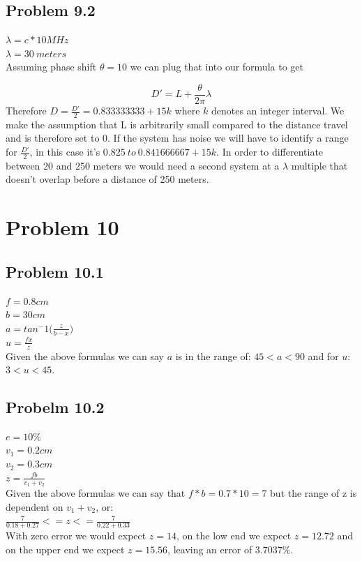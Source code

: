\documentclass{article}
\begin{document}
\newpage
\subsection{Problem 9.2}
\noindent $\lambda = c * 10 MHz$\\
$\lambda = 30\ meters$\\


Assuming phase shift $\theta = 10$ we can plug that into our formula to get

$$D' = L + \frac{\theta}{2\pi}\lambda$$
Therefore $D = \frac{D'}{2} = 0.833333333 + 15k$ where $k$ denotes an integer 
interval. We make the assumption that L is arbitrarily small compared to the 
distance travel and is therefore set to $0$. If the system has noise we will 
have to identify a range for $\frac{D'}{2}$, in this case it's $0.825\ to\ 
0.841666667 + 15k$. In order to differentiate between 20 and 250 meters we would 
need a second system at a $\lambda$ multiple that doesn't overlap before a 
distance of 250 meters.

\section{\textbf{Problem 10}}
\subsection{Problem 10.1}
\noindent$f = 0.8cm$\\
$b = 30cm$\\
$a = tan^-1 \big(\frac{z}{b-x}\big)$\\
$u = \frac{fx}{z}$\\

\noindent Given the above formulas we can say $a$ is in the range of: 
$45 < a < 90$ and for $u$: $3 < u < 45$.

\subsection{Probelm 10.2}
\noindent$e = 10\%$\\
$v_1 = 0.2cm$\\
$v_2 = 0.3cm$\\
$z = \frac{fb}{v_1 + v_2}$\\

\noindent Given the above formulas we can say that $f * b = 0.7 * 10 = 7$ but the range 
of z is dependent on $v_1 + v_2$, or:\\
$\frac{7}{0.18 + 0.27} <= z <= \frac{7}{0.22 + 0.33}$\\

\noindent With zero error we would expect $z = 14$, on the low end we expect $z = 12.72$ 
and on the upper end we expect $z = 15.56$, leaving an error of $3.7037\%$.
\end{document}
